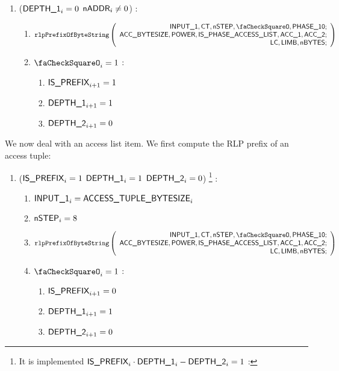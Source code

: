 \begin{enumerate}[resume]
	\item \If ($\textsf{DEPTH\_1}_{i}=0$ \et $\textsf{nADDR}_{i} \ne 0$) \Then:
		\begin{enumerate}
			\item 
				\[
					\rlpPrefixByteString
					\left( \begin{array}{r}
						\Input1,
						\ct,
						\nbstep,
						\done,
						\phase{10}; \\
						\accsize,
						\Power,
						\phaseAccessList,
						\acc1,
						\acc2; \\
						\lc,
						\limb,
						\limbsize; \\
					\end{array} \right)
				\]
			\item \If $\done_{i}=1$ \Then:
				\begin{enumerate} 
					\item $\textsf{IS\_PREFIX}_{i+1}=1$
					\item $\textsf{DEPTH\_1}_{i+1}=1$
					\item $\textsf{DEPTH\_2}_{i+1}=0$	
				\end{enumerate}
		\end{enumerate}
\end{enumerate}
We now deal with an access list item. We first compute the RLP prefix of an access tuple:
\begin{enumerate}[resume]
	\item \If ($\textsf{IS\_PREFIX}_{i}=1$ \et $\textsf{DEPTH\_1}_{i}=1$ \et $\textsf{DEPTH\_2}_{i}=0$) \footnote{It is implemented \If $\textsf{IS\_PREFIX}_{i} \cdot \textsf{DEPTH\_1}_{i} - \textsf{DEPTH\_2}_{i}=1$ \Then:} \Then:
		\begin{enumerate}
			\item $\textsf{INPUT\_1}_{i} = \textsf{ACCESS\_TUPLE\_BYTESIZE}_{i}$
			\item $\textsf{nSTEP}_{i}=8$
			\item 
				\[
					\rlpPrefixByteString
					\left( \begin{array}{r}
						\Input1,
						\ct,
						\nbstep,
						\done,
						\phase{10}; \\
						\accsize,
						\Power,
						\phaseAccessList,
						\acc1,
						\acc2; \\
						\lc,
						\limb,
						\limbsize; \\
					\end{array} \right)
				\]
			\item \If $\done_{i}=1$ \Then:
				\begin{enumerate}
					\item $\textsf{IS\_PREFIX}_{i+1}=0$
					\item $\textsf{DEPTH\_1}_{i+1}=1$
					\item $\textsf{DEPTH\_2}_{i+1}=0$ 
				\end{enumerate}
		\end{enumerate}
\end{enumerate}
